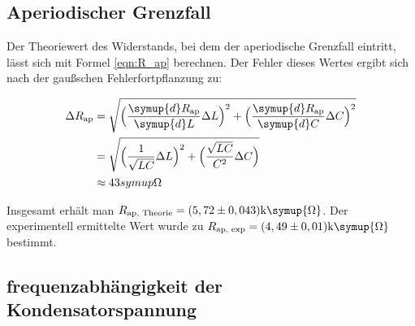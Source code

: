 \subsection{Aperiodischer Grenzfall}
\label{subsec:AuswertungB}

Der Theoriewert des Widerstands, bei dem der aperiodische Grenzfall eintritt, lässt sich mit Formel \eqref{eqn:R_ap} berechnen.
Der Fehler dieses Wertes ergibt sich nach der gaußschen Fehlerfortpflanzung zu:

\begin{align*}
  \label{eqn:err_R_ap}
  \Delta R_{\text{ap}} &= \sqrt{\Bigl(\frac{\symup{d}R_{\text{ap}}}{\symup{d}L}\Delta L \Bigr)^2+\Bigl(\frac{\symup{d}R_{\text{ap}}}{\symup{d}C}\Delta C\Bigr)^2} \\
  &= \sqrt{\Bigl(\frac{1}{\sqrt{LC}}\Delta L\Bigr)^2+\Bigl(\frac{\sqrt{LC}}{C^2}\Delta C\Bigr)} \\
  &\approx 43 symup{\Omega}
\end{align*}

Insgesamt erhält man $R_{\text{ap, Theorie}} = (5,72 \pm 0,043) \text{k}\symup{\Omega}$. Der experimentell ermittelte Wert wurde 
zu $R_{\text{ap, exp}} = (4,49 \pm 0,01) \text{k}\symup{\Omega}$ bestimmt.

\subsection{frequenzabhängigkeit der Kondensatorspannung}
\label{subsec:AuswertungC}

